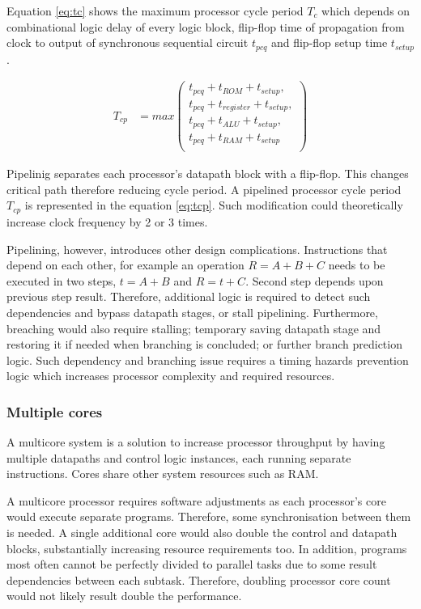 Equation \ref{eq:tc} shows the maximum processor cycle period $T_c$ which depends on combinational logic delay of every logic block, flip-flop time of propagation from clock to output of synchronous sequential circuit $t_{pcq}$ and flip-flop setup time $t_{setup}$.

\begin{align}\label{eq:tcp}
	T_{cp} &= max \left( \begin{matrix}
	t_{pcq} + t_{ROM} + t_{setup},\\
	t_{pcq} + t_{register} + t_{setup},\\
	t_{pcq} + t_{ALU} + t_{setup},\\
	t_{pcq} + t_{RAM} + t_{setup}\\
	\end{matrix}\right)
\end{align}

Pipelinig separates each processor's datapath block with a flip-flop. This changes critical path therefore reducing cycle period. A pipelined processor cycle period $T_{cp}$ is represented in the equation \ref{eq:tcp}. Such modification could theoretically increase clock frequency by 2 or 3 times.

Pipelining, however, introduces other design complications. Instructions that depend on each other, for example an operation $R = A + B + C$ needs to be executed in two steps, $t = A + B$ and $R = t + C$. Second step depends upon previous step result. Therefore, additional logic is required to detect such dependencies and bypass datapath stages, or stall pipelining. Furthermore, breaching would also require stalling; temporary saving datapath stage and restoring it if needed when branching is concluded; or further branch prediction logic. Such dependency and branching issue requires a timing hazards prevention logic which increases processor complexity and required resources. 

\subsubsection{Multiple cores}

A multicore system is a solution to increase processor throughput by having multiple datapaths and control logic instances, each running separate instructions. Cores share other system resources such as RAM.

A multicore processor requires software adjustments as each processor's core would execute separate programs. Therefore, some synchronisation between them is needed. A single additional core would also double the control and datapath blocks, substantially increasing resource requirements too. In addition, programs most often cannot be perfectly divided to parallel tasks due to some result dependencies between each subtask. Therefore, doubling processor core count would not likely result double the performance. 


